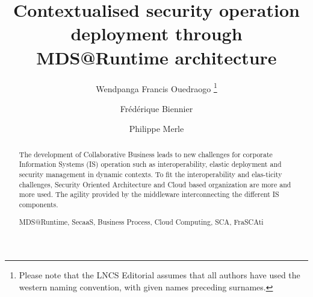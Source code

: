 \documentclass[runningheads,a4paper]{llncs}
\newcommand{\keywords}[1]{\par\addvspace\baselineskip
\noindent\keywordname\enspace\ignorespaces#1}
\begin{document}
\mainmatter  %

\title{Contextualised security operation deployment through MDS@Runtime architecture}


%
%
\author{Wendpanga Francis Ouedraogo%
\thanks{Please note that the LNCS Editorial assumes that all authors have used
the western naming convention, with given names preceding surnames.}%
\and Fr\'ed\'erique Biennier \and Philippe Merle}
%


%
%

\maketitle

\begin{abstract}
The development of Collaborative Business leads to new challenges for corporate Information Systems (IS) operation such as interoperability, elastic deployment and security management in dynamic contexts. To fit the interoperability and elas-ticity challenges, Security Oriented Architecture and Cloud based organization are more and more used. The agility provided by the  middleware interconnecting the different IS components.
\keywords{MDS@Runtime, SecaaS, Business Process, Cloud Computing, SCA, FraSCAti}
\end{abstract}
\end{document}

